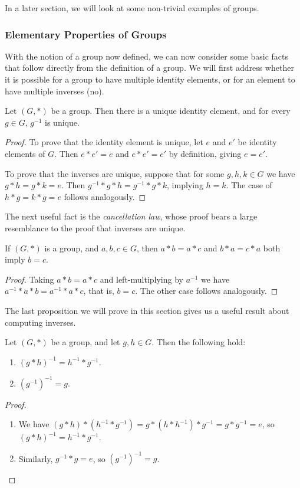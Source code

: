 \documentclass[a4paper]{scrartcl}
\newcommand{\newsubsection}{\subsubsection}
\begin{document}
In a later section, we will look at some non-trivial examples of groups.

\newsubsection{Elementary Properties of Groups}

With the notion of a group now defined, we can now consider some basic facts that follow directly from the definition of a group. We will first address whether it is possible for a group to have multiple identity elements, or for an element to have multiple inverses (no).

\begin{proposition}
	Let $(G, *)$ be a group. Then there is a unique identity element, and for every $g \in G$, $g^{-1}$ is unique.
\end{proposition}
\begin{proof}
	To prove that the identity element is unique, let $e$ and $e'$ be identity elements of $G$. Then $e* e' = e$ and $e* e' = e'$ by definition, giving $e = e'$. 
	
	To prove that the inverses are unique, suppose that for some $g, h, k \in G$ we have $g* h = g *k = e$. Then $g^{-1}* g *h = g^{-1} *g * k$, implying $h = k$. The case of $h * g = k * g = e$ follows analogously.
\end{proof}

The next useful fact is the \emph{cancellation law}, whose proof bears a large resemblance to the proof that inverses are unique.

\begin{proposition}
	If $(G, *)$ is a group, and $a, b, c \in G$, then $a*b = a*c$ and $b*a = c*a$ both imply $b = c$.
\end{proposition}
\begin{proof}
	Taking $a * b = a * c$ and left-multiplying by $a^{-1}$ we have $a^{-1} * a * b = a^{-1} * a * c$, that is, $b = c$. The other case follows analogously.
\end{proof}

The last proposition we will prove in this section gives us a useful result about computing inverses.

\begin{proposition}
	Let $(G, *)$ be a group, and let $g, h \in G$. Then the following hold:
	\begin{enumerate}[label=(\roman*)]
		\item $(g*h)^{-1} = h^{-1} * g^{-1}$.
		\item $(g^{-1})^{-1} = g$.
	\end{enumerate}
\end{proposition}
\begin{proof}$ $\phantom{\qedhere}
	\begin{enumerate}[label=(\roman*)]
		\item We have $(g*h) * (h^{-1} * g^{-1}) =  g * (h * h^{-1}) * g^{-1} = g * g^{-1} = e$, so $(g*h)^{-1} = h^{-1} * g^{-1}$.
		\item Similarly, $g^{-1} * g = e$, so $(g^{-1})^{-1} = g$. \hfill \qedsymbol
	\end{enumerate}
\end{proof}
\end{document}
